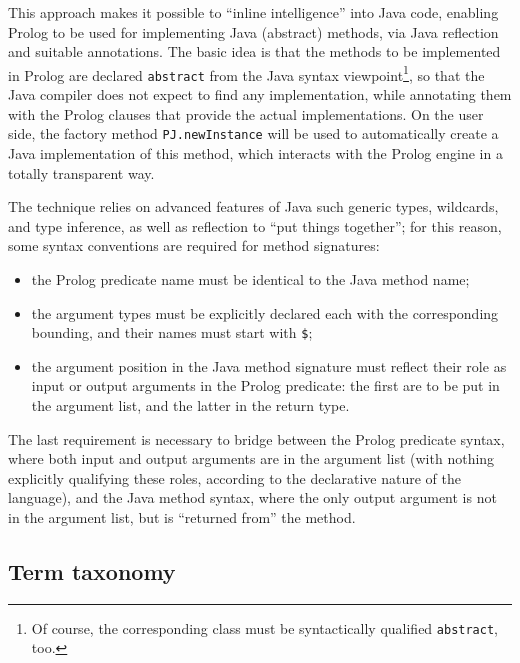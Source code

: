 This approach makes it possible to ``inline intelligence'' into Java code, enabling Prolog to be used for implementing Java (abstract) methods, via Java reflection and suitable annotations.
%
The basic idea is that the methods to be implemented in Prolog are declared
\texttt{abstract} from the Java syntax viewpoint\footnote{%
  Of course, the corresponding class must be syntactically qualified \texttt{abstract}, too.
}, so that the Java compiler does not expect to find any implementation, while annotating them with the Prolog clauses that provide the actual implementations.
On the user side, the factory method \texttt{PJ.newInstance} will be used to automatically create a Java implementation of this method, which interacts with the Prolog engine in a totally transparent way.

The technique relies on advanced features of Java such generic types, wildcards, and type inference, as well as reflection to ``put things together''; for this reason, some syntax conventions are required for method signatures:
\begin{itemize}
  \item the Prolog predicate name must be identical to the Java method name;

  \item the argument types must be explicitly declared each with the corresponding bounding, and their names must start with \texttt{\$};

  \item the argument position in the Java method signature must reflect their role as input or output arguments in the Prolog predicate: the first are to be put in the argument list, and the latter in the return type.
\end{itemize}

\noindent The last requirement is necessary to bridge between the Prolog predicate syntax, where both input and output arguments are in the argument list (with nothing explicitly qualifying these roles, according to the declarative nature of the language), and the Java method syntax, where the only output argument is not in the argument list, but is ``returned from'' the method.

\subsection{Term taxonomy}
\label{ssec:p@j-term-taxonomy}

